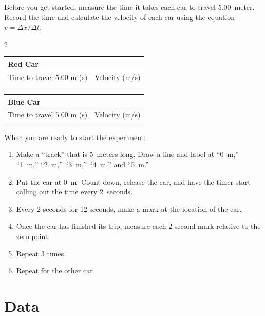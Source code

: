 \documentclass[10pt]{exam}
\begin{document}
Before you get started, measure the time it takes each car to travel 5.00~meter.  Record the time and calculate the velocity of each car using the equation $v=\Delta x/\Delta t$.

\begin{multicols}{2}
  \begin{tabular}{|l|c|}
    \hline
    \multicolumn{2}{|l|}{\bf Red Car} \\\hline
    Time to travel 5.00 m (s) &
    Velocity (m/s) \\\hline
    & \\[1em]\hline
  \end{tabular}

  \begin{tabular}{|l|c|}
    \hline
    \multicolumn{2}{|l|}{\bf Blue Car} \\\hline
    Time to travel 5.00 m (s) &
    Velocity (m/s) \\\hline
    & \\[1em]\hline
  \end{tabular}
  
\end{multicols}

\noindent
When you are ready to start the experiment:

\begin{enumerate}
  \item Make a ``track'' that is 5~meters long.  Draw a line and label at ``0~m,'' ``1~m,'' ``2~m,'' ``3~m,'' ``4~m,'' and ``5~m.''
  \item Put the car at 0~m.
  Count down, release the car, and have the timer start calling out the time every 2~seconds.
  \item Every 2 seconds for 12 seconds, make a mark at the location of the car.
  \item Once the car has finished its trip, measure each 2-second mark relative to the zero point.
  \item Repeat 3 times
  \item Repeat for the other car
\end{enumerate}

\section*{Data}

\renewcommand{\arraystretch}{1.6}
\end{document}
